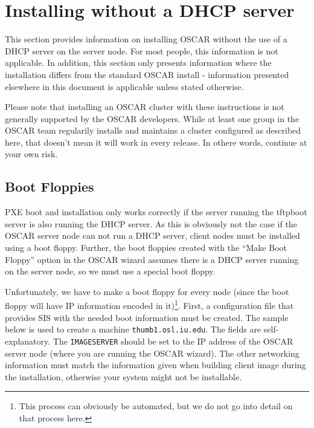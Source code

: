 %
% 
%
%
%

\section{Installing without a DHCP server}
\label{app:no_dhcp}

This section provides information on installing OSCAR without the use
of a DHCP server on the server node.  For most people, this
information is not applicable.  In addition, this section only
presents information where the installation differs from the standard
OSCAR install - information presented elsewhere in this document is
applicable unless stated otherwise.

Please note that installing an OSCAR cluster with these instructions
is not generally supported by the OSCAR developers.  While at least
one group in the OSCAR team regularily installs and maintains a
cluster configured as described here, that doesn't mean it will work
in every release.  In othere words, continue at your own risk.

\subsection{Boot Floppies}

PXE boot and installation only works correctly if the server running
the tftpboot server is also running the DHCP server.  As this is
obviously not the case if the OSCAR server node can not run a DHCP
server, client nodes must be installed using a boot floppy.  Further,
the boot floppies created with the ``Make Boot Floppy'' option in the
OSCAR wizard assumes there is a DHCP server running on the server
node, so we must use a special boot floppy.

Unfortunately, we have to make a boot floppy for every node (since the
boot floppy will have IP information encoded in it)\footnote{This
  process can obviously be automated, but we do not go into detail on
  that process here.}.  First, a configuration file that provides SIS
with the needed boot information must be created.  The sample below is
used to create a machine {\tt thumb1.osl.iu.edu}.  The fields are
self-explanatory.  The {\tt IMAGESERVER} should be set to the IP
address of the OSCAR server node (where you are running the OSCAR
wizard).  The other networking information must match the information
given when building client image during the installation, otherwise
your system might not be installable.

